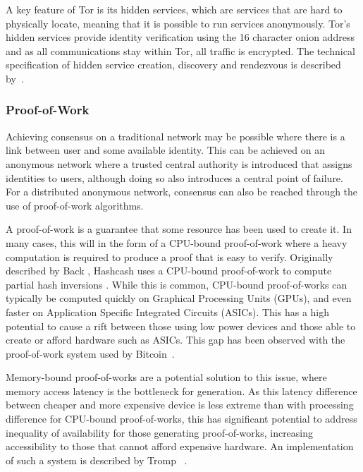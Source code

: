 			A key feature of Tor is its hidden services, which are services that are hard to physically locate, meaning that it is possible to run services anonymously. Tor's hidden services provide identity verification using the 16 character onion address and as all communications stay within Tor, all traffic is encrypted. The technical specification of hidden service creation, discovery and rendezvous is described by~\cite{tor_rend}.
			
		\subsubsection*{Proof-of-Work}
			Achieving consensus on a traditional network may be possible where there is a link between user and some available identity. This can be achieved on an anonymous network where a trusted central authority is introduced that assigns identities to users, although doing so also introduces a central point of failure. For a distributed anonymous network, consensus can also be reached through the use of proof-of-work algorithms.
			
			A proof-of-work is a guarantee that some resource has been used to create it. In many cases, this will in the form of a CPU-bound proof-of-work where a heavy computation is required to produce a proof that is easy to verify. Originally described by Back , Hashcash uses a CPU-bound proof-of-work to compute partial hash inversions \cite{back2002hashcash}. While this is common, CPU-bound proof-of-works can typically be computed quickly on Graphical Processing Units (GPUs), and even faster on Application Specific Integrated Circuits (ASICs). This has a high potential to cause a rift between those using low power devices and those able to create or afford hardware such as ASICs. This gap has been observed with the proof-of-work system used by Bitcoin~\cite{peck2013bitcoin}.
			
			Memory-bound proof-of-works are a potential solution to this issue, where memory access latency is the bottleneck for generation. As this latency difference between cheaper and more expensive device is less extreme than with processing difference for CPU-bound proof-of-works, this has significant potential to address inequality of availability for those generating proof-of-works, increasing accessibility to those that cannot afford expensive hardware. An implementation of such a system is described by Tromp ~\cite{cuckoo}.
